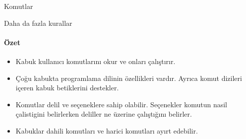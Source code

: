 \begin{section}{Komutlar}
\begin{subsection}{Daha da fazla kurallar}
\paragraph{Özet}{
\begin{itemize}
\item Kabuk kullanıcı komutlarını okur ve onları çalıştırır.
\item Çoğu kabukta programlama dilinin özellikleri vardır. Ayrıca komut dizileri içeren kabuk betiklerini destekler.
\item Komutlar delil ve seçeneklere sahip olabilir. Seçenekler komutun nasil çalistigini belirlerken deliller ne üzerine çalıştığını belirler.
\item Kabuklar dahili komutları ve harici komutları ayırt edebilir.
\end{itemize}}
\end{subsection}
\end{section}
